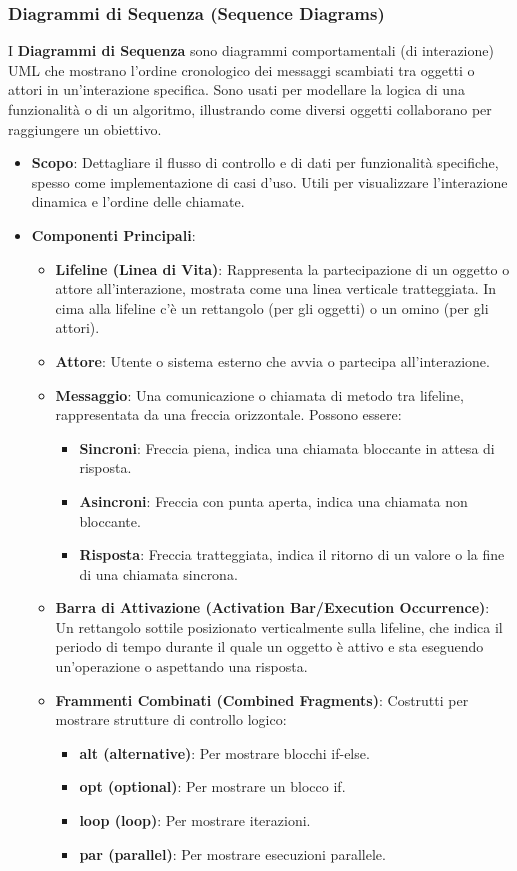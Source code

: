\subsubsection{Diagrammi di Sequenza (Sequence Diagrams)}
I \textbf{Diagrammi di Sequenza} sono diagrammi comportamentali (di interazione) UML che mostrano l'ordine cronologico dei messaggi scambiati tra oggetti o attori in un'interazione specifica. Sono usati per modellare la logica di una funzionalità o di un algoritmo, illustrando come diversi oggetti collaborano per raggiungere un obiettivo.
\begin{itemize}
    \item \textbf{Scopo}: Dettagliare il flusso di controllo e di dati per funzionalità specifiche, spesso come implementazione di casi d'uso. Utili per visualizzare l'interazione dinamica e l'ordine delle chiamate.
    \item \textbf{Componenti Principali}:
    \begin{itemize}
        \item \textbf{Lifeline (Linea di Vita)}: Rappresenta la partecipazione di un oggetto o attore all'interazione, mostrata come una linea verticale tratteggiata. In cima alla lifeline c'è un rettangolo (per gli oggetti) o un omino (per gli attori).
        \item \textbf{Attore}: Utente o sistema esterno che avvia o partecipa all'interazione.
        \item \textbf{Messaggio}: Una comunicazione o chiamata di metodo tra lifeline, rappresentata da una freccia orizzontale. Possono essere:
        \begin{itemize}
            \item \textbf{Sincroni}: Freccia piena, indica una chiamata bloccante in attesa di risposta.
            \item \textbf{Asincroni}: Freccia con punta aperta, indica una chiamata non bloccante.
            \item \textbf{Risposta}: Freccia tratteggiata, indica il ritorno di un valore o la fine di una chiamata sincrona.
        \end{itemize}
        \item \textbf{Barra di Attivazione (Activation Bar/Execution Occurrence)}: Un rettangolo sottile posizionato verticalmente sulla lifeline, che indica il periodo di tempo durante il quale un oggetto è attivo e sta eseguendo un'operazione o aspettando una risposta.
        \item \textbf{Frammenti Combinati (Combined Fragments)}: Costrutti per mostrare strutture di controllo logico:
        \begin{itemize}
            \item \textbf{alt (alternative)}: Per mostrare blocchi if-else.
            \item \textbf{opt (optional)}: Per mostrare un blocco if.
            \item \textbf{loop (loop)}: Per mostrare iterazioni.
            \item \textbf{par (parallel)}: Per mostrare esecuzioni parallele.
        \end{itemize}
    \end{itemize}
\end{itemize}
